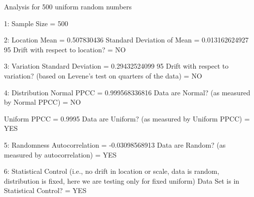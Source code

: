  
 
Analysis for 500 uniform random numbers
 
1: Sample Size                           = 500
 
2: Location
   Mean                                  = 0.507830436
   Standard Deviation of Mean            = 0.013162624927
   95%
   Drift with respect to location?       = NO
 
3: Variation
   Standard Deviation                    = 0.29432524099
   95%
   Drift with respect to variation?
   (based on Levene's test on quarters
   of the data)                          = NO
 
4: Distribution
   Normal PPCC                           = 0.999568336816
   Data are Normal?
     (as measured by Normal PPCC)        = NO
 
   Uniform PPCC                          = 0.9995
   Data are Uniform?
     (as measured by Uniform PPCC)       = YES
 
5: Randomness
   Autocorrelation                       = -0.03098568913
   Data are Random?
     (as measured by autocorrelation)    = YES
 
6: Statistical Control
   (i.e., no drift in location or scale,
   data is random, distribution is 
   fixed, here we are testing only for
   fixed uniform)
   Data Set is in Statistical Control?   = YES
 

